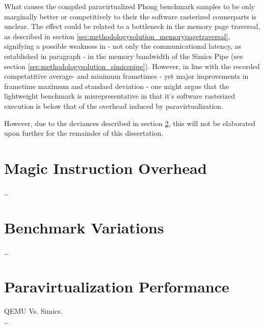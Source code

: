 What causes the compiled paravirtualized Phong benchmark samples to be only marginally better or competitively to their the software rasterized counerparts is unclear.
The effect could be related to a bottleneck in the memory page traversal, as described in section \ref{sec:methodologysolution_memorypagetraversal}, signifying a possible weakness in - not only the communicational latency, as established in paragraph  - in the memory bandwidth of the Simics Pipe (see section \ref{sec:methodologysolution_simicspipe}).
However, in line with the recorded competatitive average- and minimum frametimes  - yet major improvements in frametime maximum and standard deviation - one might argue that the lightweight benchmark is misrepresentative in that it's software rasterized execution is below that of the overhead induced by paravirtualization.

However, due to the deviances described in section \ref{sec:analysisexperiment_benchmarkvariations}, this will not be elaborated upon further for the remainder of this dissertation.


\section{Magic Instruction Overhead}
\label{sec:analysisexperiment_magicinstructionoverhead}
\ldots


\section{Benchmark Variations}
\label{sec:analysisexperiment_benchmarkvariations}
\ldots




\section{Paravirtualization Performance}
\label{sec:analysisexperiment_paravirtualizationperformance}
QEMU Vs. Simics.\\
\ldots